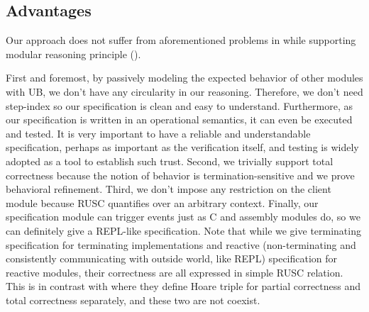 






\subsection{Advantages}
\label{sec:program:solution:advantages}
Our approach does not suffer from aforementioned problems in  while supporting modular reasoning principle ().

First and foremost, by passively modeling the expected behavior of other modules with UB, we don't have any circularity in our reasoning.
Therefore, we don't need step-index so our specification is clean and easy to understand.
Furthermore, as our specification is written in an operational semantics, it can even be executed and tested.
It is very important to have a reliable and understandable specification, perhaps as important as the verification itself, and testing is widely adopted as a tool to establish such trust.
%
Second, we trivially support total correctness because the notion of behavior is termination-sensitive and we prove behavioral refinement.
%
Third, we don't impose any restriction on the client module because RUSC quantifies over an arbitrary context.
%
Finally, our specification module can trigger events just as C and assembly modules do, so we can definitely give a REPL-like specification.
Note that while we give terminating specification for terminating implementations and reactive (non-terminating and consistently communicating with outside world, like REPL) specification for reactive modules,
their correctness are all expressed in simple RUSC relation. This is in contrast with where they define Hoare triple for partial correctness and total correctness separately, and these two are not coexist.
















